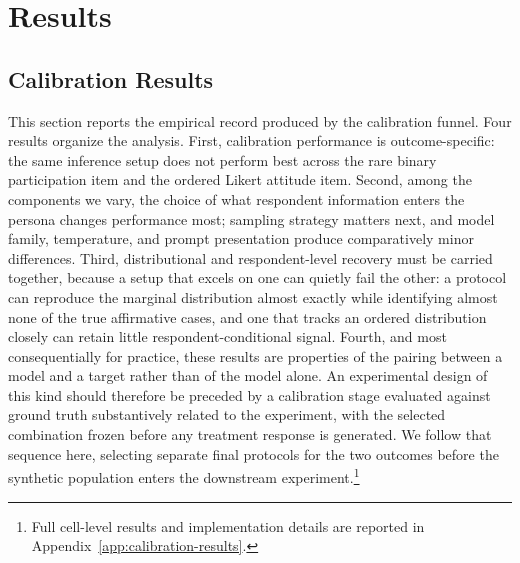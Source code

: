%

\section{Results}
\label{sec:calibration-results}

\subsection{Calibration Results}

This section reports the empirical record produced by the calibration
funnel. Four results organize the analysis. First, calibration performance
is outcome-specific: the same inference setup does not perform best across
the rare binary participation item and the ordered Likert attitude item.
Second, among the components we vary, the choice of what respondent
information enters the persona changes performance most; sampling strategy
matters next, and model family, temperature, and prompt presentation
produce comparatively minor differences. Third, distributional and
respondent-level recovery must be carried together, because a setup that
excels on one can quietly fail the other: a protocol can reproduce the
marginal distribution almost exactly while identifying almost none of the
true affirmative cases, and one that tracks an ordered distribution closely
can retain little respondent-conditional signal. Fourth, and most
consequentially for practice, these results are properties of the pairing
between a model and a target rather than of the model alone. An
experimental design of this kind should therefore be preceded by a
calibration stage evaluated against ground truth substantively related to
the experiment, with the selected combination frozen before any treatment
response is generated. We follow that sequence here, selecting separate
final protocols for the two outcomes before the synthetic population enters
the downstream experiment.\footnote{Full cell-level results and
implementation details are reported in
Appendix~\ref{app:calibration-results}.}

